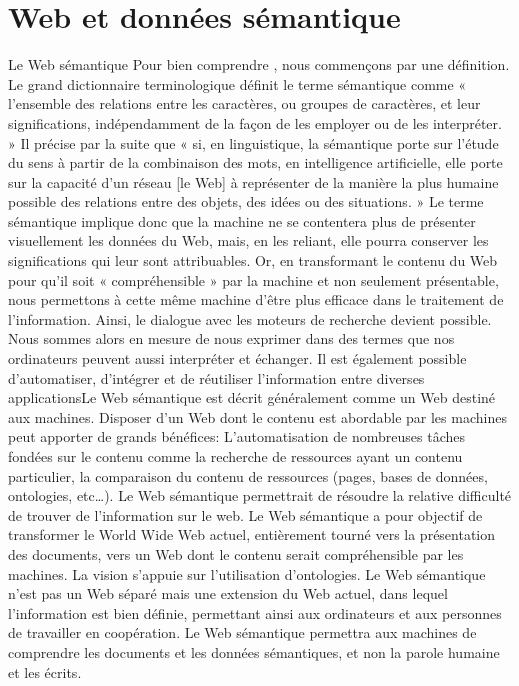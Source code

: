 \documentclass[12pt]{report}
\begin{document}
\chapter{Web et données sémantique}
Le Web sémantique Pour bien comprendre , nous commençons par une définition. Le grand dictionnaire terminologique définit le terme sémantique comme « l'ensemble des relations entre les caractères, ou groupes de caractères, et leur significations, indépendamment de la façon de les employer ou de les interpréter. » Il précise par la suite que « si, en linguistique, la sémantique porte sur l'étude du sens à partir de la combinaison des mots, en intelligence artificielle, elle porte sur la capacité d'un réseau [le Web] à représenter de la manière la plus humaine possible des relations entre des objets, des idées ou des situations. » Le terme sémantique implique donc que la machine ne se contentera plus de présenter visuellement les données du Web, mais, en les reliant, elle pourra conserver les significations qui leur sont attribuables. Or, en transformant le contenu du Web pour qu'il soit « compréhensible » par la machine et non seulement présentable, nous permettons à cette même machine d'être plus efficace dans le traitement de l'information. Ainsi, le dialogue avec les moteurs de recherche devient possible. Nous sommes alors en mesure de nous exprimer dans des termes que nos ordinateurs peuvent aussi interpréter et échanger. Il est également possible  d'automatiser, d'intégrer et de réutiliser l'information entre diverses applicationsLe Web sémantique est décrit généralement comme un Web destiné aux machines. Disposer d'un Web dont le contenu est abordable par les machines peut apporter de grands bénéfices: L'automatisation de nombreuses tâches fondées sur le contenu comme la recherche de ressources ayant un contenu particulier, la comparaison du contenu de ressources (pages, bases de données, ontologies, etc…). Le Web sémantique permettrait de résoudre la relative difficulté de trouver de l'information sur le
web.\cite{SEMANTCWEB}
Le Web sémantique a pour objectif de transformer le World Wide Web actuel, entièrement tourné vers la présentation des 
documents, vers un Web dont le contenu serait compréhensible par les machines. La vision s’appuie sur l’utilisation d’ontologies.
Le Web sémantique n’est pas un Web séparé mais une extension du Web actuel, dans lequel l’information est bien définie, permettant ainsi aux ordinateurs et aux personnes de travailler en coopération.
Le Web sémantique permettra aux machines de comprendre les documents et les données sémantiques, et non la parole humaine et les écrits.\cite{SEMANTCWEB}
\end{document}
